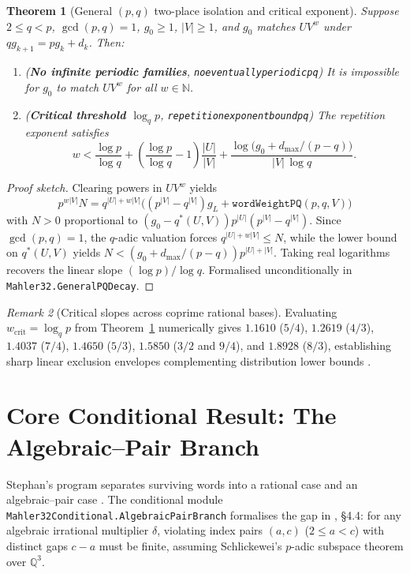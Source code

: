 \documentclass[11pt,a4paper]{article}
\newtheorem{theorem}{Theorem}[section]
\theoremstyle{remark}
\newtheorem{remark}[theorem]{Remark}
\newcommand{\Q}{\mathbb{Q}}
\newcommand{\N}{\mathbb{N}}
\renewcommand{\_}{\textunderscore\allowbreak}
\newcommand{\lean}[1]{\texttt{#1}}
\begin{document}
\begin{theorem}[General $(p,q)$ two-place isolation and critical exponent]
\label{thm:pqrep}
Suppose $2\le q<p$, $\gcd(p,q)=1$, $g_0\ge 1$, $|V|\ge 1$, and $g_0$ matches $U V^w$ under $q g_{k+1}=p g_k+d_k$. Then:
\begin{enumerate}[leftmargin=1.5em]
  \item (\textbf{No infinite periodic families}, \lean{no\_eventually\_periodic\_pq}) It is impossible for $g_0$ to match $U V^w$ for all $w\in\N$.
  \item (\textbf{Critical threshold $\log_q p$}, \lean{repetition\_exponent\_bound\_pq}) The repetition exponent satisfies
  \[
    w < \frac{\log p}{\log q} + \left(\frac{\log p}{\log q}-1\right)\frac{|U|}{|V|}
    + \frac{\log\bigl(g_0 + d_{\max}/(p-q)\bigr)}{|V|\,\log q}.
  \]
\end{enumerate}
\end{theorem}

\begin{proof}[Proof sketch]
Clearing powers in $U V^w$ yields
\[
  p^{w|V|} N = q^{|U|+w|V|}\bigl((p^{|V|}-q^{|V|})g_L+\lean{wordWeightPQ}(p,q,V)\bigr)
\]
with $N>0$ proportional to $(g_0-q^*(U,V))p^{|U|}(p^{|V|}-q^{|V|})$. Since $\gcd(p,q)=1$, the $q$-adic valuation forces $q^{|U|+w|V|}\le N$, while the lower bound on $q^*(U,V)$ yields $N<(g_0+d_{\max}/(p-q))p^{|U|+|V|}$. Taking real logarithms recovers the linear slope $(\log p)/\log q$. Formalised unconditionally in \lean{Mahler32.\allowbreak GeneralPQDecay}.
\end{proof}

\begin{remark}[Critical slopes across coprime rational bases]
Evaluating $w_{\mathrm{crit}}=\log_q p$ from Theorem~\ref{thm:pqrep} numerically gives $1.1610$ ($5/4$), $1.2619$ ($4/3$), $1.4037$ ($7/4$), $1.4650$ ($5/3$), $1.5850$ ($3/2$ and $9/4$), and $1.8928$ ($8/3$), establishing sharp linear exclusion envelopes complementing distribution lower bounds \citep{flp1995,luzheng2026}.
\end{remark}

\section{Core Conditional Result: The Algebraic--Pair Branch}
\label{sec:algpair}

Stephan's program separates surviving words into a rational case and an algebraic--pair case \citep{stephan2026subspace,stephan2026third}. The conditional module \lean{Mahler32Conditional.\allowbreak AlgebraicPairBranch} formalises the gap in \citep{stephan2026subspace}, \S4.4: for any algebraic irrational multiplier $\delta$, violating index pairs $(a,c)$ ($2\le a<c$) with distinct gaps $c-a$ must be finite, assuming Schlickewei's $p$-adic subspace theorem over $\Q^3$.
\end{document}
